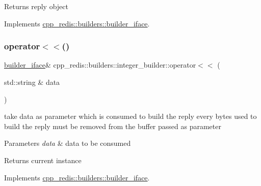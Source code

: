 \begin{DoxyReturn}{Returns}
reply object 
\end{DoxyReturn}


Implements \hyperlink{classcpp__redis_1_1builders_1_1builder__iface_afd2ff2c2371c2a486116543b638b9413}{cpp\+\_\+redis\+::builders\+::builder\+\_\+iface}.

\mbox{\label{classcpp__redis_1_1builders_1_1integer__builder_ae29f074134f7269db7f947b0fcbe312e}} 
\subsubsection{\texorpdfstring{operator$<$$<$()}{operator<<()}}
{\footnotesize\ttfamily \hyperlink{classcpp__redis_1_1builders_1_1builder__iface}{builder\+\_\+iface}\& cpp\+\_\+redis\+::builders\+::integer\+\_\+builder\+::operator$<$$<$ (\begin{DoxyParamCaption}\item[{std\+::string \&}]{data }\end{DoxyParamCaption})\hspace{0.3cm}{\ttfamily [virtual]}}

take data as parameter which is consumed to build the reply every bytes used to build the reply must be removed from the buffer passed as parameter


\begin{DoxyParams}{Parameters}
{\em data} & data to be consumed \\
\hline
\end{DoxyParams}
\begin{DoxyReturn}{Returns}
current instance 
\end{DoxyReturn}


Implements \hyperlink{classcpp__redis_1_1builders_1_1builder__iface_a9892bbc9c887c31c2742dad4476e2fa6}{cpp\+\_\+redis\+::builders\+::builder\+\_\+iface}.

\mbox{\label{classcpp__redis_1_1builders_1_1integer__builder_a259905e8a34765d6ff9d2dd64f444b54}} 
